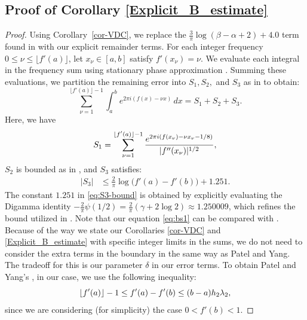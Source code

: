 \documentclass[11pt,letterpaper,oneside,reqno]{amsart}
\DeclarePairedDelimiter\floor{\lfloor}{\rfloor}
\renewcommand{\^}[1]{\widehat{#1}}
\numberwithin{equation}{section}
\theoremstyle{remark}
\newcommand*{\corref}[1]{Corollary~\ref{#1}}
\begin{document}
\subsection{Proof of Corollary \ref{Explicit_B_estimate}}\label{section-proof-cor-Explicit_B_estimate}
%
\begin{proof}
Using \corref{cor-VDC}, we replace the $\frac{3}{\pi} \log(\beta-\alpha+2) + 4.0$ term found in \cite[Lemma 2.1]{PatelYang2024} with our explicit remainder terms.
%
%
For each integer frequency $0 \le \nu \le \lfloor f'(a) \rfloor$, let $x_\nu \in [a, b]$ satisfy $f'(x_\nu) = \nu$. We evaluate each integral in the frequency sum using stationary phase approximation \cite[Lemma 2.2]{PatelYang2024}. Summing these evaluations, we partition the remaining error into $S_1, S_2,$ and $S_3$ as in \cite[eq.~(2.32)]{PatelYang2024} to obtain:
\begin{equation}
\sum_{\nu = 1}^{\lfloor f'(a) \rfloor - 1} \int_{a}^{b} e^{2\pi i (f(x) - \nu x)} \, dx =S_1 + S_2 + S_3.
\end{equation}
Here, we have 
\begin{equation}\label{eq:bs1}
    S_1 = \sum_{\nu=1}^{\floor{f'(a)}-1} \frac{e^{2\pi i (f(x_\nu)-\nu x_\nu -1/8)}}{|f''(x_\nu)|^{1/2}},
\end{equation}
 $S_2$ is bounded as in \cite[eq.~(2.34)]{PatelYang2024}, and $S_3$ satisfies:
\begin{align} |S_3| &\le  \frac{2}{\pi} \log\!\big(f'(a) - f'(b)\big) + 1.251. \label{eq:S3-bound}
\end{align}
The constant $1.251$ in \eqref{eq:S3-bound} is obtained by explicitly evaluating the Digamma identity $-\frac{2}{\pi}\psi(1/2) = \frac{2}{\pi}(\gamma + 2\log 2) \approx 1.250009$, which refines the bound utilized in \cite[eq.~(2.35)]{PatelYang2024}. Note that our equation \eqref{eq:bs1} can be compared with \cite[eq.~(2.33)]{PatelYang2024}. Because of the way we state our Corollaries \ref{cor-VDC} and \ref{Explicit_B_estimate} with specific integer limits in the sums, we do not need to consider the extra terms in the boundary in the same way as Patel and Yang. The tradeoff for this is our parameter $\delta$ in our error terms. To obtain Patel and Yang's \cite[eq.~(2.34)]{PatelYang2024}, in our case, we use the following inequality:
\[
\floor{f'(a)}-1 \le f'(a)-f'(b) \le (b-a)h_2\lambda_2,
\]
since we are considering (for simplicity) the case $0<f'(b)<1$.
\smallskip


\end{proof}
\end{document}
